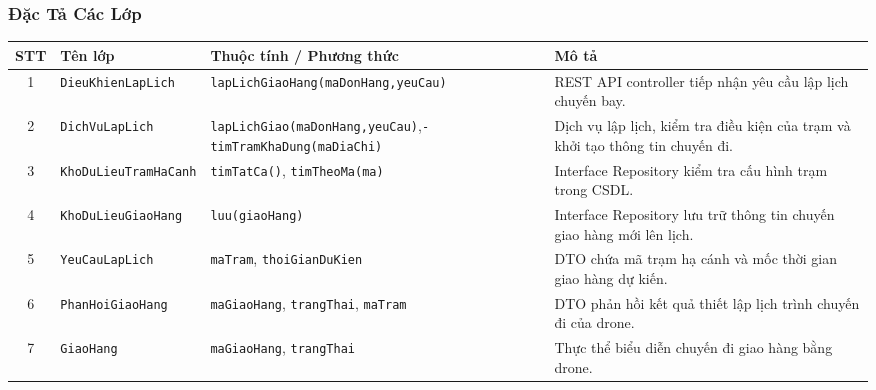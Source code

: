 \subsubsection{Đặc Tả Các Lớp}
\begin{table}[H]
  \centering
  \small
  \begin{tabularx}{\textwidth}{|c|>{\raggedright\arraybackslash}p{3.5cm}|>{\raggedright\arraybackslash}p{4.5cm}|>{\raggedright\arraybackslash}X|}
    \hline
    \textbf{STT} & \textbf{Tên lớp} & \textbf{Thuộc tính / Phương thức} & \textbf{Mô tả} \\
    \hline
    1 & \texttt{Dieu\allowbreak Khien\allowbreak Lap\allowbreak Lich} & \texttt{lap\allowbreak Lich\allowbreak Giao\allowbreak Hang\allowbreak (ma\allowbreak Don\allowbreak Hang,\allowbreak yeu\allowbreak Cau)} & REST API controller tiếp nhận yêu cầu lập lịch chuyến bay. \\ \hline
    2 & \texttt{Dich\allowbreak Vu\allowbreak Lap\allowbreak Lich} & \texttt{lap\allowbreak Lich\allowbreak Giao\allowbreak (ma\allowbreak Don\allowbreak Hang,\allowbreak yeu\allowbreak Cau)},\newline \texttt{- tim\allowbreak Tram\allowbreak Kha\allowbreak Dung\allowbreak (ma\allowbreak Dia\allowbreak Chi)} & Dịch vụ lập lịch, kiểm tra điều kiện của trạm và khởi tạo thông tin chuyến đi. \\ \hline
    3 & \texttt{Kho\allowbreak Du\allowbreak Lieu\allowbreak Tram\allowbreak Ha\allowbreak Canh} & \texttt{tim\allowbreak Tat\allowbreak Ca\allowbreak ()}, \texttt{tim\allowbreak Theo\allowbreak Ma\allowbreak (ma)} & Interface Repository kiểm tra cấu hình trạm trong CSDL. \\ \hline
    4 & \texttt{Kho\allowbreak Du\allowbreak Lieu\allowbreak Giao\allowbreak Hang} & \texttt{luu\allowbreak (giao\allowbreak Hang)} & Interface Repository lưu trữ thông tin chuyến giao hàng mới lên lịch. \\ \hline
    5 & \texttt{Yeu\allowbreak Cau\allowbreak Lap\allowbreak Lich} & \texttt{ma\allowbreak Tram}, \texttt{thoi\allowbreak Gian\allowbreak Du\allowbreak Kien} & DTO chứa mã trạm hạ cánh và mốc thời gian giao hàng dự kiến. \\ \hline
    6 & \texttt{Phan\allowbreak Hoi\allowbreak Giao\allowbreak Hang} & \texttt{ma\allowbreak Giao\allowbreak Hang}, \texttt{trang\allowbreak Thai}, \texttt{ma\allowbreak Tram} & DTO phản hồi kết quả thiết lập lịch trình chuyến đi của drone. \\ \hline
    7 & \texttt{Giao\allowbreak Hang} & \texttt{ma\allowbreak Giao\allowbreak Hang}, \texttt{trang\allowbreak Thai} & Thực thể biểu diễn chuyến đi giao hàng bằng drone. \\ \hline

\end{tabularx}
\end{table}
